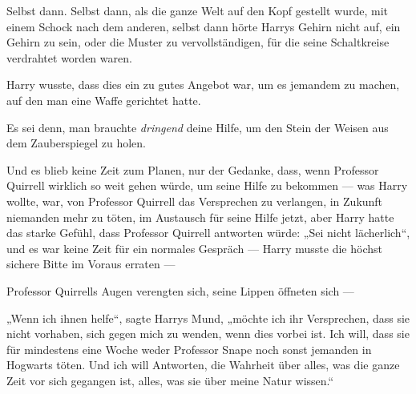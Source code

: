 \later


Selbst dann. Selbst dann, als die ganze Welt auf den Kopf gestellt wurde, mit einem Schock nach dem anderen, selbst dann hörte Harrys Gehirn nicht auf, ein Gehirn zu sein, oder die Muster zu vervollständigen, für die seine Schaltkreise verdrahtet worden waren.

Harry wusste, dass dies ein zu gutes Angebot war, um es jemandem zu machen, auf den man eine Waffe gerichtet hatte.

Es sei denn, man brauchte \emph{dringend} deine Hilfe, um den Stein der Weisen aus dem Zauberspiegel zu holen.

Und es blieb keine Zeit zum Planen, nur der Gedanke, dass, wenn Professor Quirrell wirklich so weit gehen würde, um seine Hilfe zu bekommen — was Harry wollte, war, von Professor Quirrell das Versprechen zu verlangen, in Zukunft niemanden mehr zu töten, im Austausch für seine Hilfe jetzt, aber Harry hatte das starke Gefühl, dass Professor Quirrell antworten würde:
„Sei nicht lächerlich“, und es war keine Zeit für ein normales Gespräch — Harry musste die höchst sichere Bitte im Voraus erraten —

Professor Quirrells Augen verengten sich, seine Lippen öffneten sich —

„Wenn ich ihnen helfe“, sagte Harrys Mund, „möchte ich ihr Versprechen, dass sie nicht vorhaben, sich gegen mich zu wenden, wenn dies vorbei ist. Ich will, dass sie für mindestens eine Woche weder Professor Snape noch sonst jemanden in Hogwarts töten. Und ich will Antworten, die Wahrheit über alles, was die ganze Zeit vor sich gegangen ist, alles, was sie über meine Natur wissen.“

